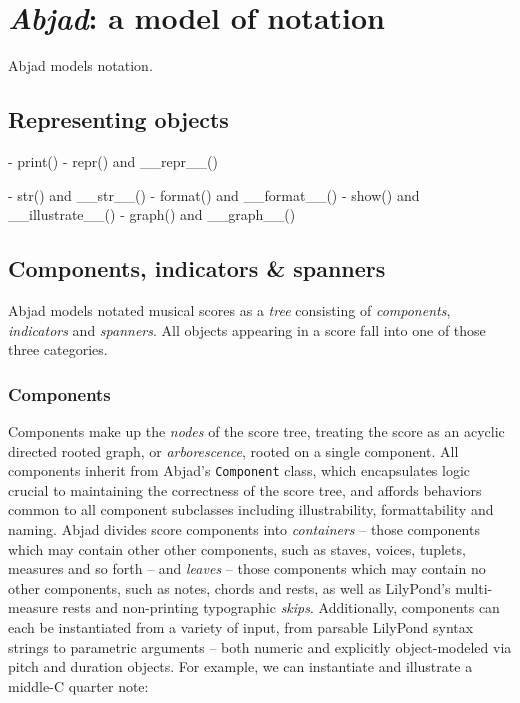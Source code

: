 \chapter{\emph{Abjad}: a model of notation}
\label{chap:a-model-of-notation}

Abjad models notation.

\section{Representing objects}

-   print()
-   repr() and \_\_repr\_\_()

-   str() and \_\_str\_\_()
-   format() and \_\_format\_\_()
-   show() and \_\_illustrate\_\_()
-   graph() and \_\_graph\_\_()

\section{Components, indicators \& spanners}
\label{sec:components-indicators-spanners}

Abjad models notated musical scores as a \emph{tree} consisting of
\emph{components}, \emph{indicators} and \emph{spanners}. All objects appearing
in a score fall into one of those three categories.

\subsection{Components}
\label{ssec:components}

Components make up the \emph{nodes} of the score tree, treating the score as an
acyclic directed rooted graph, or \emph{arborescence}, rooted on a single
component. All components inherit from Abjad's \texttt{Component} class, which
encapsulates logic crucial to maintaining the correctness of the score tree,
and affords behaviors common to all component subclasses including
illustrability, formattability and naming. Abjad divides score components into
\emph{containers} -- those components which may contain other other components,
such as staves, voices, tuplets, measures and so forth -- and \emph{leaves} --
those components which may contain no other components, such as notes, chords
and rests, as well as LilyPond's multi-measure rests and non-printing
typographic \emph{skips}. Additionally, components can each be instantiated
from a variety of input, from parsable LilyPond syntax strings to parametric
arguments -- both numeric and explicitly object-modeled via pitch and duration
objects. For example, we can instantiate and illustrate a middle-C quarter
note:

